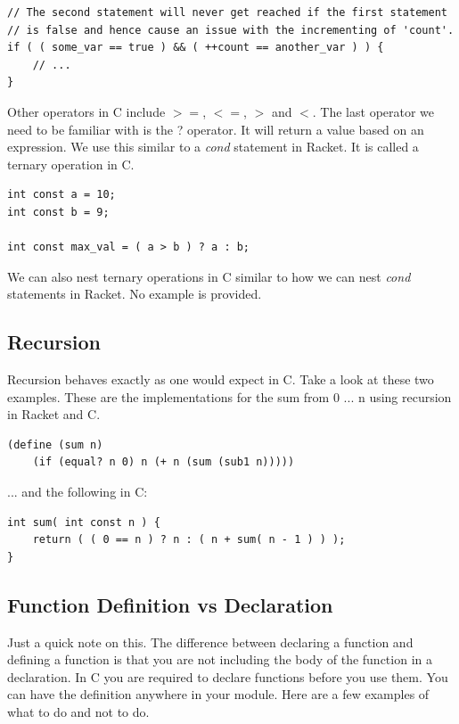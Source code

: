 \documentclass[12pt,extarticle]{article}
\begin{document}
\lstset {
	language=c
}
\begin{lstlisting}
// The second statement will never get reached if the first statement
// is false and hence cause an issue with the incrementing of 'count'.
if ( ( some_var == true ) && ( ++count == another_var ) ) {
	// ...
}
\end{lstlisting}

Other operators in C include $>=$, $<=$, $>$ and $<$. The last operator we need to be familiar with is the ? operator. It will return a value based on an expression. We use this similar to a \emph{cond} statement in Racket. It is called a ternary operation in C.\\

\lstset {
	language=c
}
\begin{lstlisting}
int const a = 10;
int const b = 9;

int const max_val = ( a > b ) ? a : b;
\end{lstlisting}

We can also nest ternary operations in C similar to how we can nest \emph{cond} statements in Racket. No example is provided.

\subsection{Recursion}

Recursion behaves exactly as one would expect in C. Take a look at these two examples. These are the implementations for the sum from 0 ... n using recursion in Racket and C.\\

\lstset {
	language=Lisp
}
\begin{lstlisting}
(define (sum n)
	(if (equal? n 0) n (+ n (sum (sub1 n)))))
\end{lstlisting}

... and the following in C:\\

\lstset {
	language=c
}
\begin{lstlisting}
int sum( int const n ) {
	return ( ( 0 == n ) ? n : ( n + sum( n - 1 ) ) );
}
\end{lstlisting}

\subsection{Function Definition vs Declaration}

Just a quick note on this. The difference between declaring a function and defining a function is that you are not including the body of the function in a declaration. In C you are required to declare functions before you use them. You can have the definition anywhere in your module. Here are a few examples of what to do and not to do.\\
\end{document}
